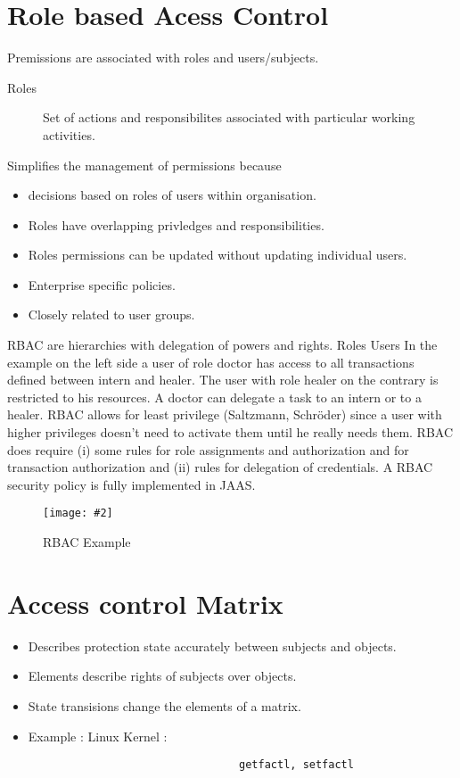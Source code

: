 \documentclass[a4paper,10pt]{scrreprt}
\newcommand{\pic}[2][figure]{\begin{figure}[h]
 \centering
 \texttt{[image: \#2]}
 \caption{#1}
\end{figure}
}
\begin{document}
\section{Role based Acess Control}
Premissions are associated with roles and users/subjects.
\begin{description}
 \item [Roles] Set of actions and responsibilites associated with particular working activities.
\end{description}

Simplifies the management of permissions because 
\begin{itemize}
 \item decisions based on roles of users within organisation.
 \item Roles have overlapping privledges and responsibilities. 
 \item Roles permissions can be updated without updating individual users. 
 \item Enterprise specific policies. 
 \item Closely related to user groups.
\end{itemize}
RBAC are hierarchies with delegation of powers
and rights.
Roles
Users
In the example on the left side a user of role doctor has
access to all transactions defined between intern and healer.
The user with role healer on the contrary is restricted to his
resources. A doctor can delegate a task to an intern or to a
healer.
RBAC allows for least privilege (Saltzmann,
Schröder) since a user with higher privileges
doesn't need to activate them until he really needs
them.
RBAC does require (i) some rules for role
assignments and authorization and for transaction
authorization and (ii) rules for delegation of
credentials. A RBAC security policy is fully
implemented in JAAS.

\pic[RBAC Example]{rbacex.png}

\section{Access control Matrix}

\begin{itemize}
 \item Describes protection state accurately between subjects and objects.
 \item Elements describe rights of subjects over objects. 
 \item State transisions change the elements of a matrix.
 \item Example : Linux Kernel : \begin{verbatim}
                                 getfactl, setfactl
                                \end{verbatim}

\end{itemize}
\end{document}
